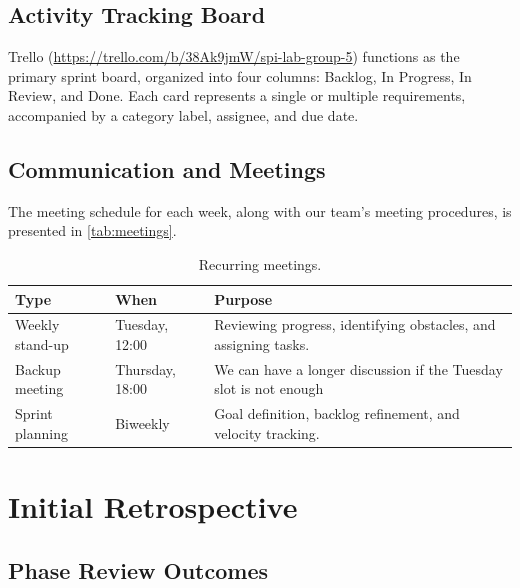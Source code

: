 \documentclass[runningheads]{llncs}
\begin{document}
\subsection{Activity Tracking Board}

Trello (\url{https://trello.com/b/38Ak9jmW/spi-lab-group-5}) functions as the primary sprint board, organized into four columns: Backlog, In Progress, In Review, and Done. Each card represents a single or multiple requirements, accompanied by a category label, assignee, and due date.

\subsection{Communication and Meetings}

The meeting schedule for each week, along with our team’s meeting procedures, is presented in \autoref{tab:meetings}.

\begin{table}[H]
    \centering
    \caption{Recurring meetings.}
    \label{tab:meetings}
    \begin{tabularx}{\textwidth}{llX}
        \toprule
        \textbf{Type}   & \textbf{When}   & \textbf{Purpose}                                                  \\
        \midrule
        Weekly stand-up & Tuesday, 12:00  & Reviewing progress, identifying obstacles, and assigning tasks.   \\ \addlinespace
        Backup meeting  & Thursday, 18:00 & We can have a longer discussion if the Tuesday slot is not enough \\ \addlinespace
        Sprint planning & Biweekly        & Goal definition, backlog refinement, and velocity tracking.       \\
        \bottomrule
    \end{tabularx}
\end{table}

\section{Initial Retrospective}

\subsection{Phase Review Outcomes}
\end{document}
